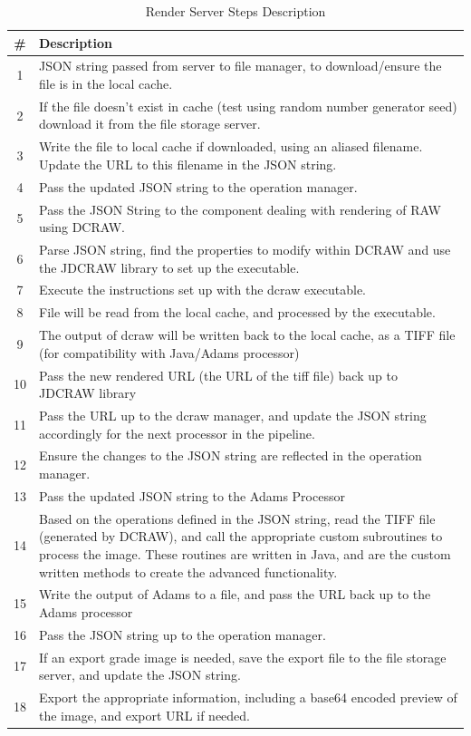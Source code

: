 \documentclass[12pt,a4paper]{article}
\begin{document}
\begin{table}
  \centering
  \begin{tabular}{| c | p{13cm} | }
    \hline
    \textbf{\#} & \textbf{Description} \\
    \hline
  1 & JSON string passed from server to file manager, to download/ensure the file is in the local cache. \\
  \hline
  2 & If the file doesn't exist in cache (test using random number generator seed) download it from the file storage server. \\
  \hline
  3 & Write the file to local cache if downloaded, using an aliased filename. Update the URL to this filename in the JSON string. \\
  \hline
  4 & Pass the updated JSON string to the operation manager. \\
  \hline
  5 & Pass the JSON String to the component dealing with rendering of RAW using DCRAW. \\
  \hline
  6 & Parse JSON string, find the properties to modify within DCRAW and use the JDCRAW library to set up the executable.\\
  \hline
  7 & Execute the instructions set up with the dcraw executable.\\
  \hline
  8 & File will be read from the local cache, and processed by the executable.\\
  \hline
  9 & The output of dcraw will be written back to the local cache, as a TIFF file (for compatibility with Java/Adams processor)\\
  \hline
  10 & Pass the new rendered URL (the URL of the tiff file) back up to JDCRAW library\\
  \hline
  11 & Pass the URL up to the dcraw manager, and update the JSON string accordingly for the next processor in the pipeline.\\
  \hline
  12 & Ensure the changes to the JSON string are reflected in the operation manager.\\
  \hline
  13 & Pass the updated JSON string to the Adams Processor\\
  \hline
  14 & Based on the operations defined in the JSON string, read the TIFF file (generated by DCRAW), and call the appropriate custom subroutines
       to process the image. These routines are written in Java, and are the custom written methods to create the advanced functionality.\\
  \hline
  15 & Write the output of Adams to a file, and pass the URL back up to the Adams processor\\
  \hline
  16 & Pass the JSON string up to the operation manager.\\
  \hline
  17 & If an export grade image is needed, save the export file to the file storage server, and update the JSON string.\\
  \hline
  18 & Export the appropriate information, including a base64 encoded preview of the image, and export URL if needed.\\
  \hline
  \end{tabular}
  \caption{Render Server Steps Description}
  \label{RenderServerDiagramTable}
\end{table}
\end{document}
